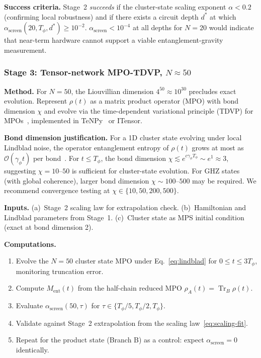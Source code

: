\documentclass[12pt,letterpaper]{article}
\theoremstyle{plain}
\theoremstyle{definition}
\newcommand{\asc}{\alpha_{\mathrm{screen}}}
\newcommand{\tr}{\operatorname{Tr}}
\begin{document}
\textbf{Success criteria.}
Stage~2 \emph{succeeds} if the cluster-state scaling exponent $\alpha < 0.2$ (confirming local robustness) and if there exists a circuit depth $d^*$ at which $\asc(20,T_\phi,d^*) \geq 10^{-2}$.  $\asc < 10^{-4}$ at all depths for $N = 20$ would indicate that near-term hardware cannot support a viable entanglement-gravity measurement.

\subsubsection*{Stage 3: Tensor-network MPO-TDVP, $N \approx 50$}

\textbf{Method.}
For $N = 50$, the Liouvillian dimension $4^{50} \approx 10^{30}$ precludes exact evolution.  Represent $\rho(t)$ as a matrix product operator (MPO) with bond dimension $\chi$ and evolve via the time-dependent variational principle (TDVP) for MPOs~\cite{Haegeman2016}, implemented in TeNPy~\cite{TeNPy} or ITensor.

\textbf{Bond dimension justification.}
For a 1D cluster state evolving under local Lindblad noise, the operator entanglement entropy of $\rho(t)$ grows at most as $\mathcal{O}(\gamma_\phi t)$ per bond~\cite{Vidal2004}.  For $t \leq T_\phi$, the bond dimension $\chi \lesssim e^{c\gamma_\phi T_\phi} \sim e^1 \approx 3$, suggesting $\chi = 10$--$50$ is sufficient for cluster-state evolution.  For GHZ states (with global coherence), larger bond dimension $\chi \sim 100$--$500$ may be required.  We recommend convergence testing at $\chi \in \{10, 50, 200, 500\}$.

\textbf{Inputs.}
(a)~Stage~2 scaling law for extrapolation check.
(b)~Hamiltonian and Lindblad parameters from Stage~1.
(c)~Cluster state as MPS initial condition (exact at bond dimension 2).

\textbf{Computations.}
\begin{enumerate}[label=(\arabic*),noitemsep]
  \item Evolve the $N = 50$ cluster state MPO under Eq.~\eqref{eq:lindblad} for $0 \leq t \leq 3T_\phi$, monitoring truncation error.
  \item Compute $M_{\mathrm{ent}}(t)$ from the half-chain reduced MPO $\rho_A(t) = \tr_B\rho(t)$.
  \item Evaluate $\asc(50,\tau)$ for $\tau \in \{T_\phi/5, T_\phi/2, T_\phi\}$.
  \item Validate against Stage~2 extrapolation from the scaling law~\eqref{eq:scaling-fit}.
  \item Repeat for the product state (Branch B) as a control: expect $\asc = 0$ identically.
\end{enumerate}
\end{document}
